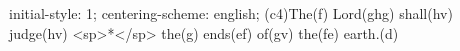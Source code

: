 initial-style: 1;
centering-scheme: english;
(c4)The(f) Lord(ghg) shall(hv) judge(hv) <sp>*</sp> the(g) ends(ef) of(gv) the(fe) earth.(d)
